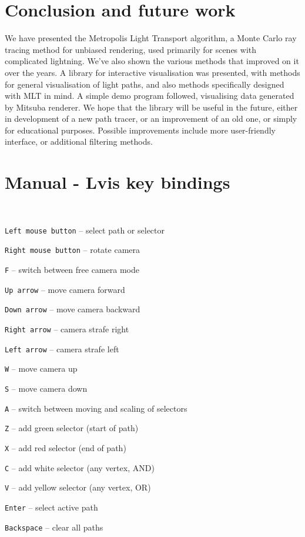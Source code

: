\chapter{Conclusion and future work}

We have presented the Metropolis Light Transport algorithm, a Monte Carlo ray tracing method for unbiased rendering, used primarily for scenes with complicated lightning. We've also shown the various methods that improved on it over the years. A library for interactive visualisation was presented, with methods for general visualisation of light paths, and also methods specifically designed with MLT in mind. A simple demo program followed, visualising data generated by Mitsuba renderer. We hope that the library will be useful in the future, either in development of a new path tracer, or an improvement of an old one, or simply for educational purposes. Possible improvements include more user-friendly interface, or additional filtering methods.

\chapter{Manual - Lvis key bindings}

\ 

\texttt{Left mouse button} -- select path or selector

\texttt{Right mouse button} -- rotate camera

\texttt{F} -- switch between free camera mode

\texttt{Up arrow} -- move camera forward

\texttt{Down arrow} -- move camera backward

\texttt{Right arrow} -- camera strafe right

\texttt{Left arrow} -- camera strafe left

\texttt{W} -- move camera up

\texttt{S} -- move camera down

\texttt{A} -- switch between moving and scaling of selectors

\texttt{Z} -- add green selector (start of path)

\texttt{X} -- add red selector (end of path)

\texttt{C} -- add white selector (any vertex, AND)

\texttt{V} -- add yellow selector (any vertex, OR)

\texttt{Enter} -- select active path

\texttt{Backspace} -- clear all paths

